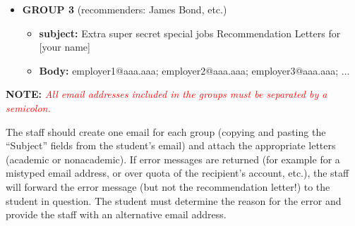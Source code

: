 \documentclass{econtex}
\begin{document}
\begin{enumerate}
\begin{itemize}
\item {\bf  GROUP 3} (recommenders: James Bond, etc.)
\begin{itemize}
\item {\bf  subject:} Extra super secret special jobs Recommendation Letters for [your name]
\item {\bf  Body:} employer1@aaa.aaa; employer2@aaa.aaa; employer3@aaa.aaa; ...
\end{itemize}
\end{itemize}

\textbf{NOTE:} \textcolor{red}{\textit{All email addresses included in the groups must be separated by a semicolon.}}

\normalsize

The staff should create one email for each group (copying and pasting
the ``Subject'' fields from the student's email) and attach
the appropriate letters (academic or nonacademic).  If error
messages are returned (for example for a mistyped email address, or
over quota of the recipient's account, etc.), the staff will forward
the error message (but not the recommendation letter!) to the student
in question. The student must determine the reason for the error and
provide the staff with an alternative email address.




\end{enumerate}
\end{document}
